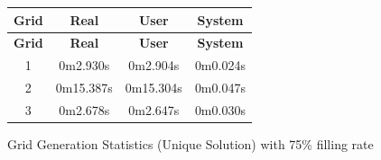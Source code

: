 \documentclass[a4paper, 11pt]{article}
\begin{document}
\begin{figure}[h]
    \centering
    \begin{longtable}{|c|c|c|c|}
        \hline
        \textbf{ Grid } & \textbf{ Real } & \textbf{ User } & \textbf{ System } \\
        \hline
        \endfirsthead
        \hline
        \textbf{Grid} & \textbf{Real} & \textbf{User} & \textbf{System} \\
        \hline
        \endhead
        \hline
        \endfoot

        1 & 0m2.930s & 0m2.904s & 0m0.024s \\
        2 & 0m15.387s & 0m15.304s & 0m0.047s \\
        3 & 0m2.678s & 0m2.647s & 0m0.030s \\
        \hline
    \end{longtable}
    \caption{Grid Generation Statistics (Unique Solution) with 75\% filling rate}
\end{figure}
\end{document}
